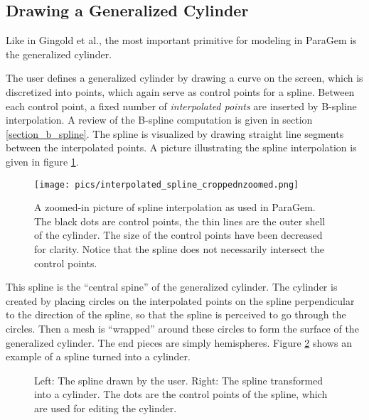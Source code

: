 \documentclass[english]{article}
\begin{document}
\subsection{Drawing a Generalized Cylinder}

Like in Gingold et al., the most important primitive for modeling in ParaGem is the generalized cylinder. 

The user defines a generalized cylinder by drawing a curve on the screen, which is discretized into points, which again serve as control points for a spline. Between each control point, a fixed number of \textit{interpolated points} are inserted by B-spline interpolation. A review of the B-spline computation is given in section \ref{section_b_spline}. The spline is visualized by drawing straight line segments between the interpolated points. A picture illustrating the spline interpolation is given in figure \ref{fig_spline}.

\begin{figure}
  \centering
  \texttt{[image: pics/interpolated\_spline\_croppednzoomed.png]}
  \caption{A zoomed-in picture of spline interpolation as used in ParaGem. The black dots are control points, the thin lines are the outer shell of the cylinder. The size of the control points have been decreased for clarity. Notice that the spline does not necessarily intersect the control points. }
  \label{fig_spline}
\end{figure}

This spline is the ``central spine'' of the generalized cylinder. The cylinder is created by placing circles on the interpolated points on the spline perpendicular to the direction of the spline, so that the spline is perceived to go through the circles. Then a mesh is ``wrapped'' around these circles to form the surface of the generalized cylinder. The end pieces are simply hemispheres. Figure \ref{fig_cylinder_example} shows an example of a spline turned into a cylinder.

\begin{figure}
  \centering
  \qquad

  \caption{Left: The spline drawn by the user. Right: The spline transformed into a cylinder. The dots are the control points of the spline, which are used for editing the cylinder.}
  \label{fig_cylinder_example}
\end{figure}
\end{document}
